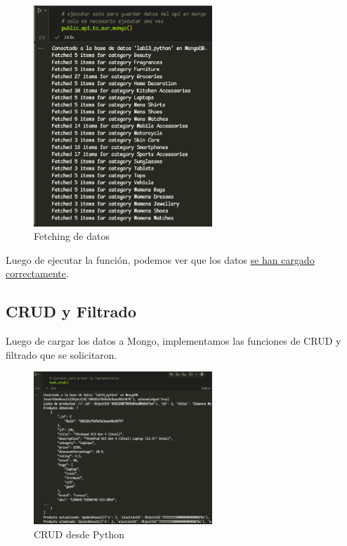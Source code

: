 \begin{figure}[H]
    \centering
    \includegraphics[width=0.6\textwidth]{./p2_fetching.png}
    \caption{Fetching de datos}\label{fig:fetching}
\end{figure}

Luego de ejecutar la función, podemos ver que los datos \hyperref[cargadatos]{se han cargado correctamente}.

\subsection{CRUD y Filtrado}

Luego de cargar los datos a Mongo, implementamos las funciones de CRUD y filtrado que se solicitaron.

\begin{figure}[H]
    \centering
    \includegraphics[width=0.6\textwidth]{./p2_crud.png}
    \caption{CRUD desde Python}\label{fig:crud}
\end{figure}

